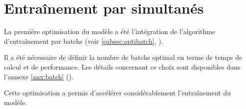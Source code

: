 \section{Entraînement par  simultanés}
La première optimisation du modèle a été l'intégration de l'algorithme d'entraînement par \glspl{batch} (voir \autoref{subsec:optibatch}, ).

Il a été nécessaire de définir la nombre de \glspl{batch} optimal en terme de temps de calcul et de performance. Les détails concernant ce choix sont disponibles dans l'annexe \ref{anx:batch} ().

Cette optimisation a permis d'accélérer considérablement l'entraînement du modèle.